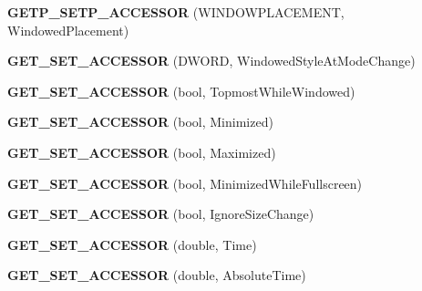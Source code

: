 \begin{DoxyCompactItemize}
\item 
\hypertarget{class_d_x_u_t_state_a5536ff55b878141213e29c0a475fb273}{{\bfseries G\+E\+T\+P\+\_\+\+S\+E\+T\+P\+\_\+\+A\+C\+C\+E\+S\+S\+O\+R} (W\+I\+N\+D\+O\+W\+P\+L\+A\+C\+E\+M\+E\+N\+T, Windowed\+Placement)}\label{class_d_x_u_t_state_a5536ff55b878141213e29c0a475fb273}

\item 
\hypertarget{class_d_x_u_t_state_a5b16a6c1961ef412cff6e67cdb6018e5}{{\bfseries G\+E\+T\+\_\+\+S\+E\+T\+\_\+\+A\+C\+C\+E\+S\+S\+O\+R} (D\+W\+O\+R\+D, Windowed\+Style\+At\+Mode\+Change)}\label{class_d_x_u_t_state_a5b16a6c1961ef412cff6e67cdb6018e5}

\item 
\hypertarget{class_d_x_u_t_state_ad26450006ff4e314b24aca74ea91bb26}{{\bfseries G\+E\+T\+\_\+\+S\+E\+T\+\_\+\+A\+C\+C\+E\+S\+S\+O\+R} (bool, Topmost\+While\+Windowed)}\label{class_d_x_u_t_state_ad26450006ff4e314b24aca74ea91bb26}

\item 
\hypertarget{class_d_x_u_t_state_ac4601af8960b515e304bc4f0bb28dbe6}{{\bfseries G\+E\+T\+\_\+\+S\+E\+T\+\_\+\+A\+C\+C\+E\+S\+S\+O\+R} (bool, Minimized)}\label{class_d_x_u_t_state_ac4601af8960b515e304bc4f0bb28dbe6}

\item 
\hypertarget{class_d_x_u_t_state_a500e3875a183dcaa6c0cb0a2cdc74cc1}{{\bfseries G\+E\+T\+\_\+\+S\+E\+T\+\_\+\+A\+C\+C\+E\+S\+S\+O\+R} (bool, Maximized)}\label{class_d_x_u_t_state_a500e3875a183dcaa6c0cb0a2cdc74cc1}

\item 
\hypertarget{class_d_x_u_t_state_a07cafa9805d4a519c5d8f3b3dd174325}{{\bfseries G\+E\+T\+\_\+\+S\+E\+T\+\_\+\+A\+C\+C\+E\+S\+S\+O\+R} (bool, Minimized\+While\+Fullscreen)}\label{class_d_x_u_t_state_a07cafa9805d4a519c5d8f3b3dd174325}

\item 
\hypertarget{class_d_x_u_t_state_ae22f397c5dcea02a491307d4a8627673}{{\bfseries G\+E\+T\+\_\+\+S\+E\+T\+\_\+\+A\+C\+C\+E\+S\+S\+O\+R} (bool, Ignore\+Size\+Change)}\label{class_d_x_u_t_state_ae22f397c5dcea02a491307d4a8627673}

\item 
\hypertarget{class_d_x_u_t_state_a9928c8caea52f9375d6c9ec2bf49264d}{{\bfseries G\+E\+T\+\_\+\+S\+E\+T\+\_\+\+A\+C\+C\+E\+S\+S\+O\+R} (double, Time)}\label{class_d_x_u_t_state_a9928c8caea52f9375d6c9ec2bf49264d}

\item 
\hypertarget{class_d_x_u_t_state_a63afe2875d0d29822bdd8abdbc2c5bcb}{{\bfseries G\+E\+T\+\_\+\+S\+E\+T\+\_\+\+A\+C\+C\+E\+S\+S\+O\+R} (double, Absolute\+Time)}\label{class_d_x_u_t_state_a63afe2875d0d29822bdd8abdbc2c5bcb}


\end{DoxyCompactItemize}
